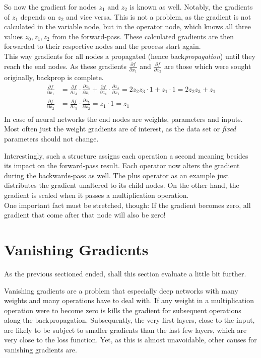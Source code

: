 So now the gradient for nodes $z_1$ and $z_2$ is known as well.
Notably, the gradients of $z_1$ depends on $z_2$ and vice versa.
This is not a problem, as the gradient is not calculated in the variable node, but in the operator node, which knows all three values $z_0, z_1, z_2$ from the forward-pass.
These calculated gradients are then forwarded to their respective nodes and the process start again.\\
This way gradients for all nodes a propagated (hence back\textit{propagation}) until they reach the end nodes.
As these gradients $\frac{\partial f}{\partial x_1}$ and $\frac{\partial f}{\partial x_2}$ are those which were sought originally, backprop is complete.
\begin{align}
    \frac{\partial f}{\partial x_1} & = \frac{\partial f}{\partial z_3} \cdot \frac{\partial z_3}{\partial x_1} + \frac{\partial f}{\partial z_4} \cdot \frac{\partial z_4}{\partial x_1} = 2 z_2 z_3 \cdot 1 + z_1 \cdot 1 = 2 z_2 z_3 + z_1 \\
    \frac{\partial f}{\partial x_2} & = \frac{\partial f}{\partial z_5} \cdot \frac{\partial z_5}{\partial x_2} = z_1 \cdot 1 = z_1 \\
\end{align}
In case of neural networks the end nodes are weights, parameters and inputs.
Most often just the weight gradients are of interest, as the data set or \textit{fixed} parameters should not change.

Interestingly, such a structure assigns each operation a second meaning besides its impact on the forward-pass result.
Each operator now alters the gradient during the backwards-pass as well.
The plus operator as an example just distributes the gradient unaltered to its child nodes.
On the other hand, the gradient is scaled when it passes a multiplication operation. \\
One important fact must be stretched, though:
If the gradient becomes zero, all gradient that come after that node will also be zero!

\section{Vanishing Gradients}
As the previous sectioned ended, shall this section evaluate a little bit further.

Vanishing gradients are a problem that especially deep networks with many weights and many operations have to deal with.
If any weight in a multiplication operation were to become zero is kills the gradient for subsequent operations along the backpropagation.
Subsequently, the very first layers, close to the input, are likely to be subject to smaller gradients than the last few layers, which are very close to the loss function.
Yet, as this is almost unavoidable, other causes for vanishing gradients are.

